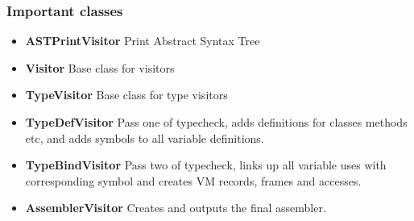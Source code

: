 \documentclass[a4paper,11pt]{article}
\begin{document}
      \subsubsection{Important classes}
         \begin{itemize}
            \item \textbf{ASTPrintVisitor} Print Abstract Syntax Tree
            \item \textbf{Visitor} Base class for visitors
            \item \textbf{TypeVisitor} Base class for type visitors
            \item \textbf{TypeDefVisitor} Pass one of typecheck, adds definitions for classes methods etc, and adds symbols to all variable definitions.
            \item \textbf{TypeBindVisitor} Pass two of typecheck, links up all variable uses with corresponding symbol and creates VM records, frames and accesses.
            \item \textbf{AssemblerVisitor} Creates and outputs the final assembler.
         \end{itemize}
\end{document}
